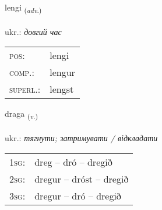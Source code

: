 \documentclass[frontgrid, backgrid]{flacards}\usepackage[]{graphicx}\usepackage[]{xcolor}
\begin{document}
{lengi \small{\textsubscript{(\textit{adv.})}} \\[1ex] %
\textphonetic{[leiɲcɪ]} \\
ukr.: \emph{довгий час} \\  [2ex]
\renewcommand*{\arraystretch}{0.8}
\begin{tabular}{ll}
\textsc{pos}: & lengi \\ 
\textsc{comp.}: & lengur \\ 
\textsc{superl.}: & lengst \\
\end{tabular}
}

\renewcommand{\flhead}{\vskip5pt \fboxsep=0pt {\small\bfseries\footnotesize Sagnorð | дієслово}}
\renewcommand{\fcfoot}{\vskip5pt \fboxsep=0pt \hspace{2pt}{\small\bfseries\footnotesize 1K}}

\renewcommand{\blhead}{\vskip5pt {\small\bfseries\footnotesize Sagnorð | дієслово }}
\renewcommand{\bcfoot}{\vskip5pt \hspace{2pt}{\small\bfseries\footnotesize 1K}}


{draga \small{\textsubscript{(\textit{v.})}} \\[1ex] %
\textphonetic{[traːɣa]} \\
ukr.: \emph{тягнути; затримувати / відкладати} \\  [2ex]
\renewcommand*{\arraystretch}{0.8}
\begin{tabular}{p{1cm}l}
\textsc{1sg}: & dreg -- dró -- dregið \\ 
\textsc{2sg}: & dregur -- dróst -- dregið \\ 
\textsc{3sg}: & dregur -- dró -- dregið \\ 
\end{tabular}
}

\renewcommand{\flhead}{\vskip5pt \fboxsep=0pt {\small\bfseries\footnotesize Nafnorð | іменник}}
\renewcommand{\fcfoot}{\vskip5pt \fboxsep=0pt \hspace{2pt}{\small\bfseries\footnotesize 1K}}
\end{document}
